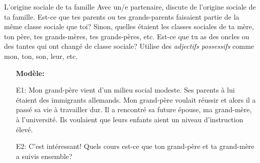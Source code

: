 \begin{frame}{L'origine sociale de ta famille}
  Avec un/e partenaire, discute de l'origine sociale de \alert{ta} famille.
  Est-ce que \alert{tes} parents ou \alert{tes} grands-parents faisaient partie de la même classe sociale que toi?
  Sinon, quelles étaient les classes sociales de \alert{ta} mère, \alert{ton} père, \alert{tes} grands-mères, \alert{tes} grands-pères, etc.
  Est-ce que tu as des oncles ou des tantes qui ont changé de classe sociale?
  Utilise des \emph{adjectifs possessifs} comme \alert{mon}, \alert{ton}, \alert{son}, \alert{leur}, etc.
  \begin{itemize}
    \item[] \textbf{Modèle:}
    \item[E1:] \alert{Mon} grand-père vient d'un milieu social modeste. \alert{Ses} parents à lui étaient des immigrants allemands. \alert{Mon} grand-père voulait réussir et alors il a passé \alert{sa}
    vie à travailler dur. Il a rencontré \alert{sa} future épouse, \alert{ma} grand-mère, à l'université. Ils voulaient que \alert{leurs} enfants aient un niveau d'instruction élevé.
    \item[E2:] C'est intéressant! Quels cours est-ce que \alert{ton} grand-père et \alert{ta} grand-mère a suivis ensemble?
  \end{itemize}
\end{frame}